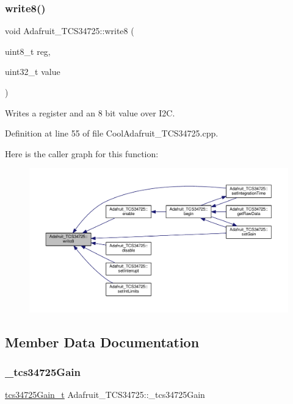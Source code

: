 \subsubsection{\texorpdfstring{write8()}{write8()}}
{\footnotesize\ttfamily void Adafruit\+\_\+\+T\+C\+S34725\+::write8 (\begin{DoxyParamCaption}\item[{uint8\+\_\+t}]{reg,  }\item[{uint32\+\_\+t}]{value }\end{DoxyParamCaption})}



Writes a register and an 8 bit value over I2C. 



Definition at line 55 of file Cool\+Adafruit\+\_\+\+T\+C\+S34725.\+cpp.

Here is the caller graph for this function\+:\nopagebreak
\begin{figure}[H]
\begin{center}
\leavevmode
\includegraphics[width=350pt]{class_adafruit___t_c_s34725_aa526557ad0d76b3b6e31e6197de583e6_icgraph}
\end{center}
\end{figure}


\subsection{Member Data Documentation}
\mbox{\label{class_adafruit___t_c_s34725_ae614cd13b99a10b8e05ec78cab05c700}} 
\subsubsection{\texorpdfstring{\+\_\+tcs34725\+Gain}{\_tcs34725Gain}}
{\footnotesize\ttfamily \hyperlink{_cool_adafruit___t_c_s34725_8h_a23611ba111ac38012551332ee7189f9a}{tcs34725\+Gain\+\_\+t} Adafruit\+\_\+\+T\+C\+S34725\+::\+\_\+tcs34725\+Gain\hspace{0.3cm}{\ttfamily [private]}}



